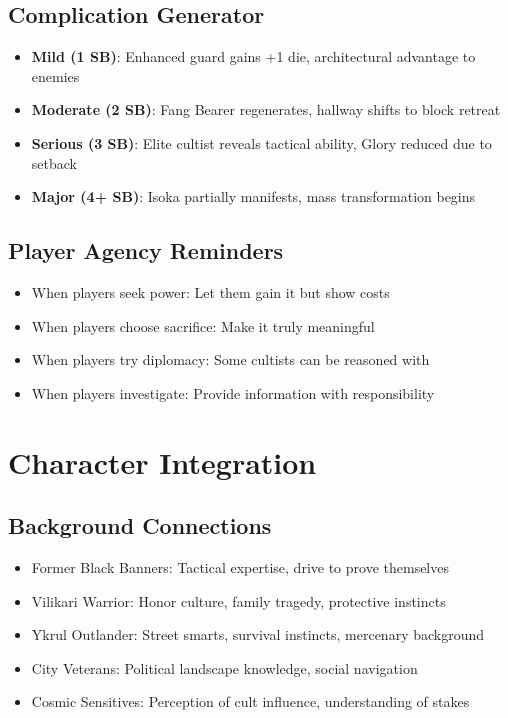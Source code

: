 \documentclass[11pt]{article}
\begin{document}
\subsection*{Complication Generator}
\begin{itemize}
    \item \textbf{Mild (1 SB)}: Enhanced guard gains +1 die, architectural advantage to enemies
    \item \textbf{Moderate (2 SB)}: Fang Bearer regenerates, hallway shifts to block retreat
    \item \textbf{Serious (3 SB)}: Elite cultist reveals tactical ability, Glory reduced due to setback
    \item \textbf{Major (4+ SB)}: Isoka partially manifests, mass transformation begins
\end{itemize}

\subsection*{Player Agency Reminders}
\begin{itemize}
    \item When players seek power: Let them gain it but show costs
    \item When players choose sacrifice: Make it truly meaningful
    \item When players try diplomacy: Some cultists can be reasoned with
    \item When players investigate: Provide information with responsibility
\end{itemize}

\section*{Character Integration}

\subsection*{Background Connections}
\begin{itemize}
    \item Former Black Banners: Tactical expertise, drive to prove themselves
    \item Vilikari Warrior: Honor culture, family tragedy, protective instincts
    \item Ykrul Outlander: Street smarts, survival instincts, mercenary background
    \item City Veterans: Political landscape knowledge, social navigation
    \item Cosmic Sensitives: Perception of cult influence, understanding of stakes
\end{itemize}
\end{document}
